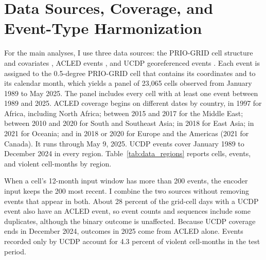 \documentclass[11pt, letterpaper]{article}
\begin{document}
\section{Data Sources, Coverage, and Event-Type Harmonization}
\label{app:harmonize}
For the main analyses, I use three data sources: the PRIO-GRID cell structure and covariates \citep{tollefsen2012priogrid}, ACLED events \citep{raleigh2010acled}, and UCDP georeferenced events \citep{sundberg2013ucdp}. Each event is assigned to the 0.5-degree PRIO-GRID cell that contains its coordinates and to its calendar month, which yields a panel of 23,065 cells observed from January 1989 to May 2025. The panel includes every cell with at least one event between 1989 and 2025. ACLED coverage begins on different dates by country, in 1997 for Africa, including North Africa; between 2015 and 2017 for the Middle East; between 2010 and 2020 for South and Southeast Asia; in 2018 for East Asia; in 2021 for Oceania; and in 2018 or 2020 for Europe and the Americas (2021 for Canada). It runs through May 9, 2025. UCDP events cover January 1989 to December 2024 in every region. Table~\ref{tab:data_regions} reports cells, events, and violent cell-months by region.

When a cell's 12-month input window has more than 200 events, the encoder input keeps the 200 most recent. I combine the two sources without removing events that appear in both. About 28 percent of the grid-cell days with a UCDP event also have an ACLED event, so event counts and sequences include some duplicates, although the binary outcome is unaffected. Because UCDP coverage ends in December 2024, outcomes in 2025 come from ACLED alone. Events recorded only by UCDP account for 4.3 percent of violent cell-months in the test period.
\end{document}
